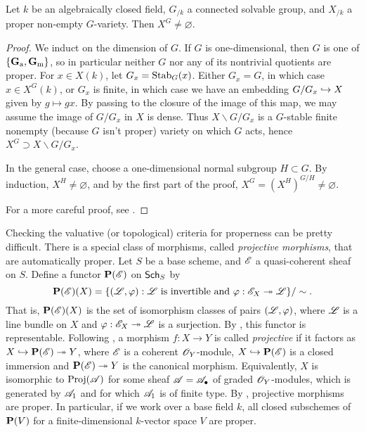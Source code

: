 \begin{theorem}\label{thm:borel-fixed}
Let $k$ be an algebraically closed field, $G_{/k}$ a connected solvable group, 
and $X_{/k}$ a proper non-empty $G$-variety. Then $X^G\ne\varnothing$. 
\end{theorem}
\begin{proof}
We induct on the dimension of $G$. If $G$ is one-dimensional, then 
$G$ is one of $\{\mathbf{G}_\mathrm{a},\mathbf{G}_\mathrm{m}\}$, so in particular neither $G$ nor any of its 
nontrivial quotients are proper. For $x\in X(k)$, let 
$G_x=\operatorname{Stab}_G(x)$. Either $G_x=G$, in which case $x\in X^G(k)$, or 
$G_x$ is finite, in which case we have an embedding $G/G_x\hookrightarrow X$ given 
by $g\mapsto g x$. By passing to the closure of the image of this map, 
we may assume the image of $G/G_x$ in $X$ is dense. Thus 
$X\smallsetminus G/G_x$ is a $G$-stable finite nonempty (because $G$ 
isn't proper) variety on which $G$ acts, hence 
$X^G\supset X\smallsetminus G/G_x$. 

In the general case, choose a one-dimensional normal subgroup 
$H\subset G$. By induction, $X^H\ne\varnothing$, and by the first part of 
the proof, $X^G=(X^H)^{G/H}\ne\varnothing$. 

For a more careful proof, see \cite[18.1]{milne-iAG}. 
\end{proof}

Checking the valuative (or topological) criteria for properness can be pretty 
difficult. There is a special class of morphisms, called \emph{projective 
morphisms}, that are automatically proper. Let $S$ be a base scheme, and 
$\mathscr{E}$ a quasi-coherent sheaf on $S$. Define a functor $\mathbf{P}(\mathscr{E})$ on 
$\mathsf{Sch}_{S}$ by 
\[
  \mathbf{P}(\mathscr{E})(X) = \{(\mathscr{L},\varphi):\text{$\mathscr{L}$ is invertible and }\varphi:\mathscr{E}_X\twoheadrightarrow \mathscr{L}\} /\sim .
\]
That is, $\mathbf{P}(\mathscr{E})(X)$ is the set of isomorphism classes of pairs 
$(\mathscr{L},\varphi)$, where $\mathscr{L}$ is a line bundle on $X$ and 
$\varphi:\mathscr{E}_X\twoheadrightarrow \mathscr{L}$ is a surjection. By \cite[II 4.2.3]{ega2}, this 
functor is representable. Following \cite[II 5.5.2]{ega2}, a morphism 
$f:X\to Y$ is called \emph{projective} if it factors as 
$X\hookrightarrow \mathbf{P}(\mathscr{E})\twoheadrightarrow Y$, where $\mathscr{E}$ is a coherent $\mathscr{O}_Y$-module, 
$X\hookrightarrow \mathbf{P}(\mathscr{E})$ is a closed immersion and $\mathbf{P}(\mathscr{E})\twoheadrightarrow Y$ is the 
canonical morphism. Equivalently, $X$ is isomorphic to $\operatorname{Proj}(\mathscr{A})$ for 
some sheaf $\mathscr{A}=\mathscr{A}_\bullet$ of graded $\mathscr{O}_Y$-modules, which is generated 
by $\mathscr{A}_1$ and for which $\mathscr{A}_1$ is of finite type. By 
\cite[II 5.5.3]{ega2}, projective morphisms are proper. In particular, 
if we work over a base field $k$, all closed subschemes of 
$\mathbf{P}(V)$ for a finite-dimensional $k$-vector space $V$ are proper. 





